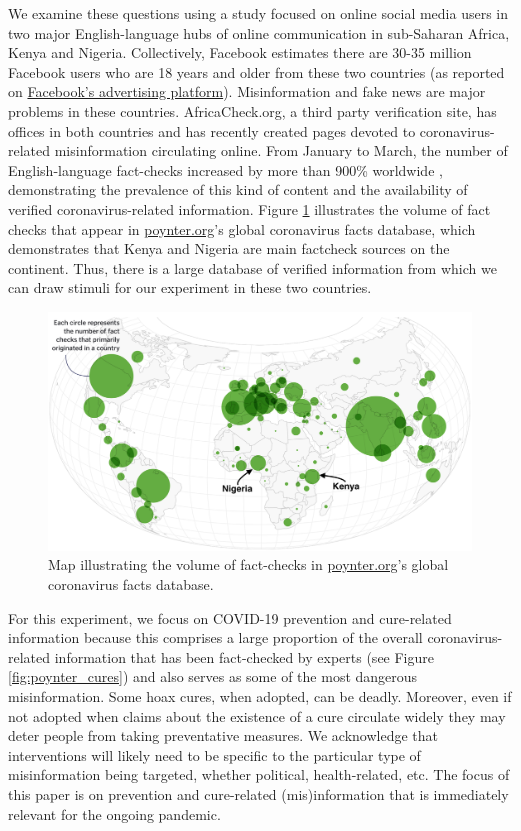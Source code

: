 \documentclass[letterpaper, 12pt, parskip=full,]{scrartcl}
\begin{document}
We examine these questions using a study focused on online social media users in two major English-language hubs of online communication in sub-Saharan Africa, Kenya and Nigeria.  Collectively, Facebook estimates there are 30-35 million Facebook users who are 18 years and older from these two countries (as reported on \href{https://www.facebook.com/business/insights/tools/audience-insights?ref=ens_rdr}{Facebook's advertising platform}). Misinformation and fake news are major problems in these countries. AfricaCheck.org, a third party verification site, has offices in both countries and has recently created pages devoted to coronavirus-related misinformation circulating online. From January to March, the number of English-language fact-checks increased by more than 900\% worldwide \citep{brennen2020types}, demonstrating the prevalence of this kind of content and the availability of verified coronavirus-related information.  Figure \ref{fig:poynter} illustrates the volume of fact checks that appear in \url{poynter.org}'s global coronavirus facts database, which demonstrates that Kenya and Nigeria are main factcheck sources on the continent. Thus, there is a large database of verified information from which we can draw stimuli for our experiment in these two countries. 

\begin{figure}[!htb]
\centering
\caption{Map illustrating the volume of fact-checks in \url{poynter.org}'s global coronavirus facts database.}
\label{fig:poynter}
\includegraphics[width=.95\textwidth]{poynter2.png}
\end{figure}

For this experiment, we focus on COVID-19 prevention and cure-related information because this comprises a large proportion of the overall coronavirus-related information that has been fact-checked by experts (see Figure \ref{fig:poynter_cures}) and also serves as some of the most dangerous misinformation. Some hoax cures, when adopted, can be deadly. Moreover, even if not adopted when claims about the existence of a cure circulate widely they may deter people from taking preventative measures. We acknowledge that interventions will likely need to be specific to the particular type of misinformation being targeted, whether political, health-related, etc. The focus of this paper is on prevention and cure-related (mis)information that is immediately relevant for the ongoing pandemic. 
\end{document}
